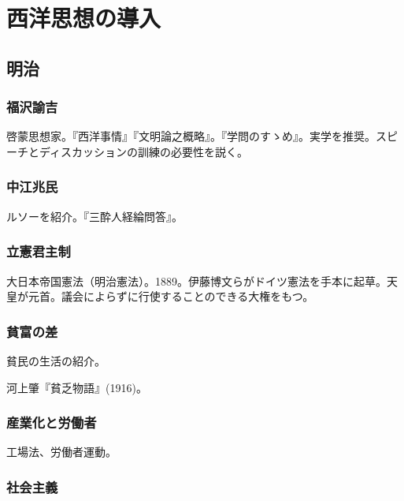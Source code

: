 \documentclass[uplatex,dvipdfmx]{jsarticle} \usepackage{mystyle}%
\title{}
\begin{document}
\maketitle




\else\chapter{西洋思想の導入}\fi



\section{明治}


\subsection{福沢諭吉}

啓蒙思想家。『西洋事情』『文明論之概略』。『学問のすゝめ』。実学を推奨。スピーチとディスカッションの訓練の必要性を説く。

\subsection{中江兆民}

ルソーを紹介。『三酔人経綸問答』。

\subsection{立憲君主制}

大日本帝国憲法（明治憲法）。1889。伊藤博文らがドイツ憲法を手本に起草。天皇が元首。議会によらずに行使することのできる大権をもつ。


\subsection{貧富の差}

貧民の生活の紹介。

河上肇『貧乏物語』(1916)。

\subsection{産業化と労働者}

工場法、労働者運動。

\subsection{社会主義}
\end{document}
